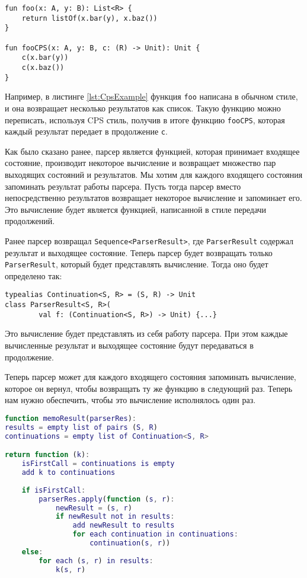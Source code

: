 \begin{lstlisting}[float=ht, label={lst:CpsExample}, caption=Пример функции в CPS стиле]
fun foo(x: A, y: B): List<R> {
    return listOf(x.bar(y), x.baz())
}

fun fooCPS(x: A, y: B, c: (R) -> Unit): Unit {
    c(x.bar(y))
    c(x.baz())
}
\end{lstlisting}

Например, в листинге \ref{lst:CpsExample} функция \texttt{foo} написана в обычном стиле, и она возвращает несколько результатов как список. Такую функцию можно переписать, используя CPS стиль, получив в итоге функцию \texttt{fooCPS}, которая каждый результат передает в продолжение \texttt{c}.

Как было сказано ранее, парсер является функцией, которая принимает входящее состояние, производит некоторое вычисление и возвращает множество пар выходящих состояний и результатов. Мы хотим для каждого входящего состояния запоминать результат работы парсера. Пусть тогда парсер вместо непосредственно результатов возвращает некоторое вычисление и запоминает его. Это вычисление будет является функцией, написанной в стиле передачи продолжений. 

Ранее парсер возвращал \lstinline|Sequence<ParserResult>|, где \lstinline|ParserResult| содержал результат и выходящее состояние. Теперь парсер будет возвращать только \lstinline|ParserResult|, который будет представлять вычисление. Тогда оно будет определено так:

\begin{lstlisting}[float=ht]
typealias Continuation<S, R> = (S, R) -> Unit
class ParserResult<S, R>(
        val f: (Continuation<S, R>) -> Unit) {...}
\end{lstlisting}

Это вычисление будет представлять из себя работу парсера. При этом каждые вычисленные результат и выходящее состояние будут передаваться в продолжение.

Теперь парсер может для каждого входящего состояния запоминать вычисление, которое он вернул, чтобы возвращать ту же функцию в следующий раз. Теперь нам нужно обеспечить, чтобы это вычисление исполнялось один раз.

\begin{lstlisting}[language=Matlab, label={lst:memoResult}, float=ht, caption=Мемоизация результата парсера]
function memoResult(parserRes):
results = empty list of pairs (S, R)
continuations = empty list of Continuation<S, R>

return function (k):
    isFirstCall = continuations is empty
    add k to continuations
    
    if isFirstCall:
        parserRes.apply(function (s, r):
            newResult = (s, r)
            if newResult not in results:
                add newResult to results
                for each continuation in continuations:
                    continuation(s, r))   
    else:
        for each (s, r) in results:
            k(s, r)
\end{lstlisting}

